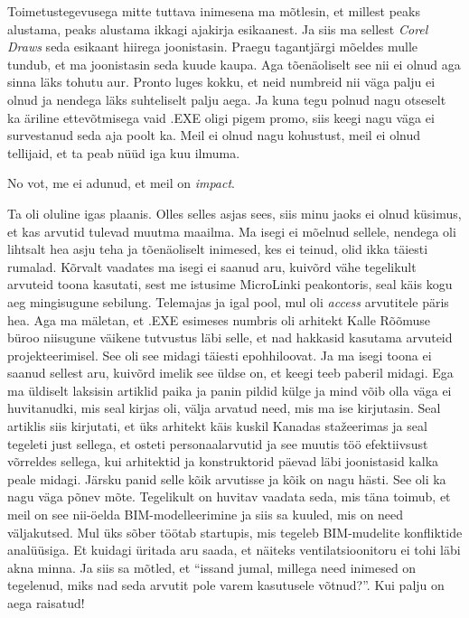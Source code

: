 Toimetustegevusega mitte tuttava inimesena ma mõtlesin, et millest peaks alustama, peaks alustama ikkagi ajakirja esikaanest. Ja siis ma sellest \emph{Corel Draws} seda esikaant  hiirega joonistasin. Praegu tagantjärgi mõeldes mulle tundub, et ma joonistasin seda kuude kaupa. Aga tõenäoliselt see nii ei olnud aga sinna läks tohutu aur. Pronto luges kokku, et neid numbreid nii väga palju ei olnud ja nendega läks suhteliselt palju aega. Ja kuna tegu polnud nagu otseselt ka äriline ettevõtmisega vaid .EXE oligi pigem promo, siis keegi nagu väga ei survestanud seda aja poolt ka. Meil ei olnud nagu kohustust, meil ei olnud tellijaid, et ta peab nüüd iga kuu ilmuma.


No vot, me ei adunud, et meil on \emph{impact}.


Ta oli oluline igas plaanis. Olles selles asjas sees, siis minu jaoks ei olnud  küsimus, et kas arvutid tulevad muutma maailma. Ma isegi ei mõelnud sellele, nendega oli lihtsalt hea asju teha ja  tõenäoliselt inimesed, kes ei teinud, olid ikka täiesti rumalad. Kõrvalt vaadates ma isegi ei saanud aru, kuivõrd vähe tegelikult arvuteid toona kasutati, sest me istusime MicroLinki peakontoris, seal käis kogu aeg mingisugune sebilung. Telemajas ja igal pool, mul oli \emph{access} arvutitele päris hea. Aga ma mäletan, et .EXE  esimeses numbris  oli arhitekt Kalle Rõõmuse büroo niisugune väikene tutvustus  läbi selle, et nad hakkasid kasutama arvuteid projekteerimisel. See oli see midagi täiesti epohhiloovat. Ja ma isegi toona ei saanud sellest aru, kuivõrd imelik see  üldse on, et keegi teeb  paberil midagi. Ega  ma üldiselt  laksisin artiklid paika ja panin pildid külge ja mind võib olla väga ei huvitanudki, mis seal kirjas oli, välja arvatud need, mis ma ise kirjutasin. Seal artiklis siis kirjutati, et üks arhitekt käis  kuskil Kanadas stažeerimas ja seal tegeleti just sellega, et osteti personaalarvutid ja see  muutis  töö efektiivsust võrreldes sellega, kui arhitektid ja konstruktorid päevad läbi joonistasid kalka peale midagi.  Järsku panid selle kõik arvutisse ja kõik on nagu hästi. See oli ka nagu väga põnev mõte. Tegelikult on huvitav vaadata seda, mis täna toimub, et meil on see nii-öelda BIM-modelleerimine ja siis sa kuuled, mis on need  väljakutsed. Mul üks sõber töötab startupis, mis tegeleb BIM-mudelite konfliktide analüüsiga. Et  kuidagi üritada aru saada, et näiteks ventilatsioonitoru ei tohi läbi akna minna. Ja siis sa mõtled, et \enquote{issand jumal, millega need inimesed on tegelenud, miks nad seda arvutit pole varem kasutusele võtnud?}. Kui palju on aega raisatud!

